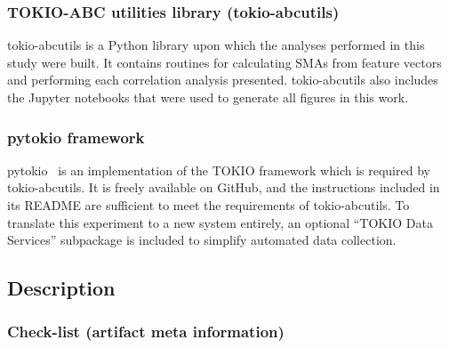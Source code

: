 \subsubsection{TOKIO-ABC utilities library (tokio-abcutils)}

tokio-abcutils is a Python library upon which the analyses performed in this study were built.
It contains routines for calculating SMAs from feature vectors and performing each correlation analysis presented.
tokio-abcutils also includes the Jupyter notebooks that were used to generate all figures in this work.

\subsubsection{pytokio framework}

pytokio~\cite{Lockwood2018tokio} is an implementation of the TOKIO framework which is required by tokio-abcutils.
It is freely available on GitHub, and the instructions included in its README are sufficient to meet the requirements of tokio-abcutils.
To translate this experiment to a new system entirely, an optional ``TOKIO Data Services'' subpackage is included to simplify automated data collection.

\subsection{Description}

\subsubsection{Check-list (artifact meta information)}


